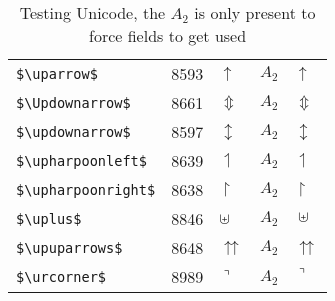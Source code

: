 \documentclass{article}
\begin{document}
\begin{table}
\begin{center}
\begin{tabular}{llll}
 \verb#$\uparrow$#            & 8593 & $\uparrow$            & $A_2\quad \uparrow$\\
 \verb#$\Updownarrow$#        & 8661 & $\Updownarrow$        & $A_2\quad \Updownarrow$\\
 \verb#$\updownarrow$#        & 8597 & $\updownarrow$        & $A_2\quad \updownarrow$\\
 \verb#$\upharpoonleft$#      & 8639 & $\upharpoonleft$      & $A_2\quad \upharpoonleft$\\
 \verb#$\upharpoonright$#     & 8638 & $\upharpoonright$     & $A_2\quad \upharpoonright$\\
 \verb#$\uplus$#              & 8846 & $\uplus$              & $A_2\quad \uplus$\\
 \verb#$\upuparrows$#         & 8648 & $\upuparrows$         & $A_2\quad \upuparrows$\\
 \verb#$\urcorner$#           & 8989 & $\urcorner$           & $A_2\quad \urcorner$\\
\end{tabular}
\end{center}
\caption{Testing Unicode, the $A_2$ is only present to force fields to get used}
\end{table}
\end{document}
